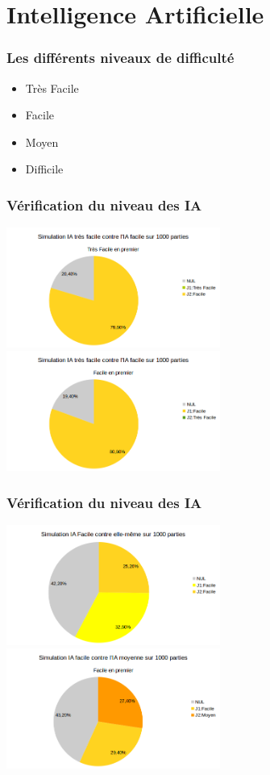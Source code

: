 \documentclass{beamer}
\begin{document}
\section{Intelligence Artificielle}%

\begin{frame}
\frametitle{Les diff\'erents niveaux de difficult\'e}
\begin{itemize}
\item Tr\`es Facile
\item Facile
\item Moyen
\item Difficile
\end{itemize}
\end{frame}


\begin{frame}
\frametitle{V\'erification du niveau des IA}
\begin{center}
\includegraphics[width=7cm]{./TresFacFac.png}
\includegraphics[width=7cm]{./FacTresFac.png}
\end{center}
\end{frame}

\begin{frame}
\frametitle{V\'erification du niveau des IA}
\begin{center}
\includegraphics[width=7cm]{./MoyFac.png}
\includegraphics[width=7cm]{./FacMoy.png}
\end{center}
\end{frame}
\end{document}
